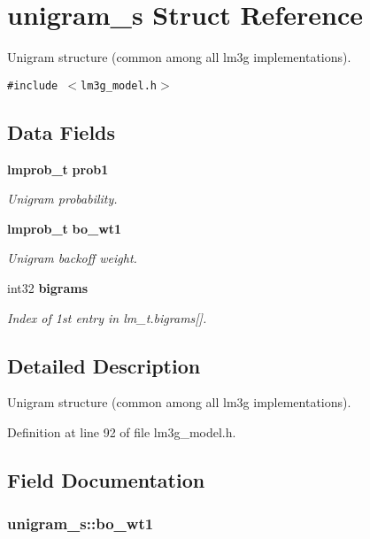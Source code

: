 \section{unigram\_\-s Struct Reference}
\label{structunigram__s}
Unigram structure (common among all lm3g implementations).  


{\tt \#include $<$lm3g\_\-model.h$>$}

\subsection*{Data Fields}
\begin{CompactItemize}
\item 
{\bf lmprob\_\-t} {\bf prob1}
\begin{CompactList}\small\item\em Unigram probability. \item\end{CompactList}\item 
{\bf lmprob\_\-t} {\bf bo\_\-wt1}
\begin{CompactList}\small\item\em Unigram backoff weight. \item\end{CompactList}\item 
int32 {\bf bigrams}\label{structunigram__s_e148f631c0d9851b14bb9cb31c0c061d}

\begin{CompactList}\small\item\em Index of 1st entry in lm\_\-t.bigrams[]. \item\end{CompactList}\end{CompactItemize}


\subsection{Detailed Description}
Unigram structure (common among all lm3g implementations). 

Definition at line 92 of file lm3g\_\-model.h.

\subsection{Field Documentation}
\subsubsection[{bo\_\-wt1}]{ {\bf unigram\_\-s::bo\_\-wt1}}\label{structunigram__s_d33b4af5b40a8d13ffae932bab003df6}


